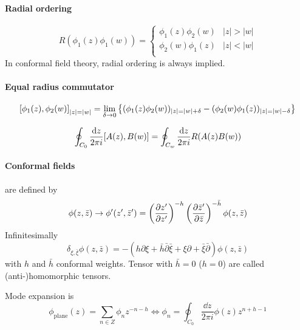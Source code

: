 \documentclass[12pt, a4paper, DIV=15]{article}
\numberwithin{equation}{section}
\begin{document}
\paragraph{Radial ordering}
\begin{equation}
	R(\phi_1(z)\phi_1(w)) = 
	\begin{cases}
		\phi_1(z) \phi_2(w) & |z| > |w| \\
		\phi_2(w) \phi_1(z) & |z| < |w| \\
	\end{cases}
\end{equation}
In conformal field theory, radial ordering is always implied.

\paragraph{Equal radius commutator}
\begin{equation}
	\comm{\phi_1(z)}{\phi_2(w)}_{|z|=|w|} = \lim_{\delta \rightarrow 0} \left\{ (\phi_1(z)\phi_2(w))_{|z| = |w| + \delta} - (\phi_2(w) \phi_1(z))_{|z| = |w| - \delta} \right\}
\end{equation}

\begin{equation}
	\oint_{C_0} \frac{\dd{z}}{2\pi i} \comm{A(z)}{B(w)} =  \oint_{C_w} \frac{\dd{z}}{2\pi i} R(A(z) B(w))
\end{equation}


\paragraph{Conformal fields} are defined by
\begin{equation}
	\phi(z,\bar{z}) \rightarrow \phi'(z',\bar{z}') = \left( \pdv{z'}{z'} \right)^{-h} \left( \pdv{\bar{z}'}{\bar{z}} \right)^{-\bar{h}} \phi(z,\bar{z})
\end{equation}
Infinitesimally
\begin{equation}
	\delta_{\xi,\bar{\xi}} \phi(z,\bar{z}) = - (h \partial \xi + \bar{h} \bar{\partial} \bar{\xi} + \xi \partial + \bar{\xi} \bar{\partial}) \phi(z,\bar{z})
	\label{math:delta_xi}
\end{equation}
with $h$ and $\bar{h}$ conformal weights. Tensor with $\bar{h}=0$ ($h=0$) are called (anti-)homomorphic tensors.

Mode expansion is
\begin{equation}
	\phi_\text{plane} (z) = \sum_{n \in Z} \phi_n z^{-n-h} \Leftrightarrow \phi_n = \oint_{C_0} \frac{\dd{z}}{2\pi i} \phi(z) z^{n+h-1}
\end{equation}
\end{document}
